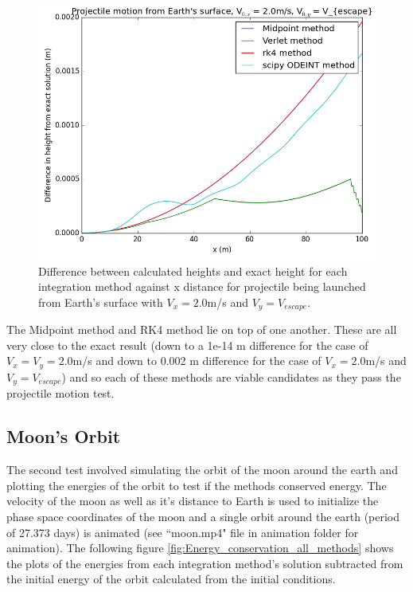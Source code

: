 \documentclass[10pt,letterpaper]{article}
\begin{document}
\begin{figure}[!htb]
\centering
\includegraphics[scale=0.6]{figures/test_cases/projectile_motion_escape_velocity_difference_from_exact_good_methods.png}
\caption{Difference between calculated heights and exact height for each integration method against x distance for projectile being launched from Earth's surface with $V_x = 2.0$m/s and $V_y = V_{escape}$.}\label{fig:projectile_motion_escape_velocity_difference_from_exact_good_methods}
\end{figure}

The Midpoint method and RK4 method lie on top of one another. These are all very close to the exact result (down to a 1e-14 m difference for the case of $V_x = V_y = 2.0$m/s and down to 0.002 m difference for the case of  $V_x = 2.0$m/s and $V_y = V_{escape}$) and so each of these methods are viable candidates as they pass the projectile motion test.\\ 

\subsection{Moon's Orbit}

The second test involved simulating the orbit of the moon around the earth and plotting the energies of the orbit to test if the methods conserved energy. The velocity of the moon as well as it's distance to Earth is used to initialize the phase space coordinates of the moon and a single orbit around the earth (period of 27.373 days) is animated (see ``moon.mp4" file in animation folder for animation). The following figure \ref{fig:Energy_conservation_all_methods} shows the plots of the energies from each integration method's solution subtracted from the initial energy of the orbit calculated from the initial conditions.\\
\end{document}
